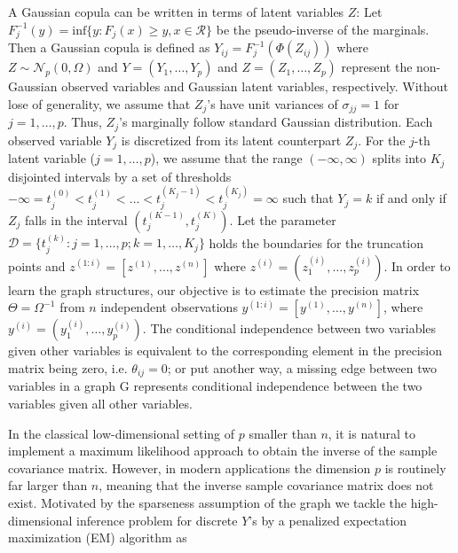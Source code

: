 A Gaussian copula can be written in terms of latent variables $Z$: Let $F_j^{-1}(y) = \mbox{inf}\{ y: F_j(x) \ge y, x \in \mathcal{R} \}$ be the pseudo-inverse of the marginals. %
Then a Gaussian copula is defined as
$Y_{ij} = F_j^{-1} (\Phi(Z_{ij}))$ where $Z \sim \mathcal{N}_p (0, \Omega)$ and 
$Y= (Y_1, \ldots, Y_p)$ and $Z= (Z_1, \ldots, Z_p)$ represent the non-Gaussian observed variables and Gaussian latent variables, respectively. %
Without lose of generality, we assume that $Z_j$'s have unit variances of $\sigma_{jj}= 1$ for $j = 1,\ldots,p$. Thus, $Z_j$'s marginally follow standard Gaussian distribution. Each observed variable $Y_j$ is discretized from its latent counterpart $Z_j$. For the $j$-th latent	variable ($j = 1, \ldots,p$), we assume that the range $(-\infty, \infty)$ splits into $K_j$ disjointed intervals by a set of thresholds $ -\infty = t^{(0)}_j < t^{(1)}_j < \ldots < t^{(K_j-1)}_j < t^{(K_j)}_j = \infty $ such that $Y_j = k$ if and only if $Z_j$ falls in the interval $(t^{(K-1)}_j , t^{(K)}_j)$. Let the parameter $\mathcal{D} = \{ t^{(k)}_j:  j =1,\ldots,p; k = 1, \ldots, K_j\}$ holds the boundaries for the truncation points
 and $z^{(1:i)} = [z^{(1)}, \ldots, z^{(n)}]$ where  $z^{(i)} = (z_1^{(i)}, \ldots, z_p^{(i)})$. 
In order to learn the graph structures, our objective is to estimate the precision matrix $\Theta = \Omega^{-1}$ from $n$ independent observations $y^{(1:i)} = [y^{(1)}, \ldots, y^{(n)}]$, where $y^{(i)} = (y_1^{(i)}, \ldots, y_p^{(i)})$. The conditional independence between two variables given other variables is equivalent to the corresponding element in the precision matrix being zero, i.e. $\theta_{ij} = 0$; or put another way, a missing edge between two variables in a graph G represents conditional independence between the two variables given all other variables. %

In the classical low-dimensional setting of $p$ smaller than $n$, it is natural to implement a maximum likelihood approach to obtain the inverse of the sample covariance matrix. However, in modern applications the dimension $p$ is routinely far larger than $n$, meaning that the inverse sample covariance matrix does not exist. Motivated by the sparseness assumption of the graph we tackle the high-dimensional inference problem for discrete $Y$'s by a penalized expectation maximization (EM) algorithm as

